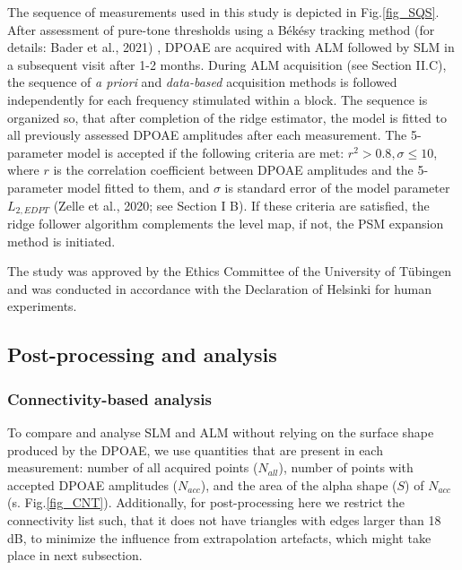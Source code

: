\documentclass[journal,twoside,web]{ieeecolor2}
\begin{document}
The sequence of measurements used in this study is depicted in Fig.\ref{fig_SQS}. After assessment of pure-tone thresholds using a Békésy tracking method (for details: Bader et al., 2021) , DPOAE are acquired with ALM followed by SLM in a subsequent visit after 1-2 months. During ALM acquisition (see Section II.C), the sequence of \textit{a priori} and \textit{data-based} acquisition methods is followed independently for each frequency stimulated within a block. The sequence is organized so, that after completion of the ridge estimator, the model is fitted to all previously assessed DPOAE amplitudes after each measurement. The 5-parameter model is accepted if the following criteria are met: $r^2 > 0.8, \sigma \le 10$, where $r$ is the correlation coefficient between DPOAE amplitudes and the 5-parameter model fitted to them, and $\sigma $ is standard error of the model parameter $L_{2, EDPT}$ (Zelle et al., 2020; see Section I B). If these criteria are satisfied, the ridge follower algorithm complements the level map, if not, the PSM expansion method is initiated. 

The study was approved by the Ethics Committee of the University of Tübingen and   was conducted in accordance with the Declaration of Helsinki for human experiments.

\subsection{Post-processing and analysis}

\subsubsection{Connectivity-based analysis}
To compare and analyse SLM and ALM without relying on the surface shape produced by the DPOAE, we use quantities that are present in each measurement: number of all acquired points ($N_{all}$), number of points with accepted DPOAE amplitudes ($N_{acc}$), and the area of the alpha shape ($S$) of $N_{acc}$ (s. Fig.\ref{fig_CNT}). Additionally, for post-processing here we restrict the connectivity list such, that it does not have triangles with edges larger than 18 dB, to minimize the influence from extrapolation artefacts, which might take place in next subsection.
\end{document}
